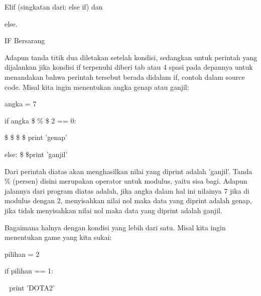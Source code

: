 Elif (singkatan dari: else if) dan \par
\noindent 
\vspace{\baselineskip}
else.\vspace{\baselineskip}
 \par
\noindent 
\vspace{\baselineskip}
IF Bersarang \par
\noindent 
\vspace{\baselineskip}
Adapun tanda titik dua diletakan setelah kondisi, sedangkan untuk perintah yang dijalankan jika kondisi if terpenuhi diberi tab atau 4 spasi pada depannya untuk menandakan bahwa perintah tersebut berada didalam if, contoh dalam source code. Misal kita ingin menentukan angka genap atau ganjil: \par
\noindent 
\vspace{\baselineskip}
angka = 7 \par
\noindent 
\vspace{\baselineskip}
if angka  \$  \%  \$ 2 == 0: \par
\noindent 
\vspace{\baselineskip}
 \$  \$  \$  \$ print 'genap' \par
\noindent 
\vspace{\baselineskip}
else:\vspace{\baselineskip}
 \$  \$print 'ganjil' \par
\noindent 
\vspace{\baselineskip}
 Dari perintah diatas akan menghasilkan nilai yang diprint adalah 'ganjil'. Tanda  $  \%  $ (persen) disini merupakan operator untuk modulus, yaitu sisa bagi. Adapun jalannya dari program diatas adalah, jika angka dalam hal ini nilainya 7 jika di modulus dengan 2, menyisahkan nilai nol maka data yang diprint adalah genap, jika tidak menyisahkan nilai nol maka data yang diprint adalah ganjil. \par
\noindent 
\vspace{\baselineskip}
Bagaimana halnya dengan kondisi yang lebih dari satu. Misal kita ingin menentukan game yang kita sukai: \par
\noindent 
\vspace{\baselineskip}
pilihan = 2 \par
\noindent 
\vspace{\baselineskip}
if pilihan == 1: \par
\noindent 
\vspace{\baselineskip}
 $  $  $  $ print 'DOTA2' \par
\noindent 
